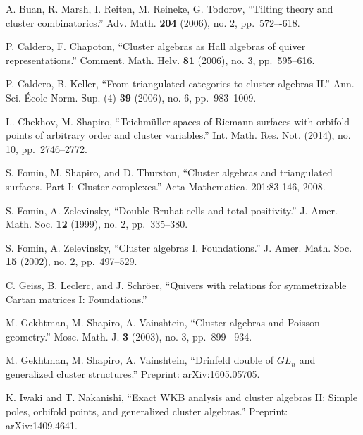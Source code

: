 \documentclass{amsart}
\numberwithin{equation}{section}
\theoremstyle{definition}
\begin{document}
\begin{thebibliography}{99}
A. Buan, R. Marsh, I. Reiten, M. Reineke, G. Todorov, ``Tilting theory and cluster combinatorics.'' Adv. Math. \textbf{204} (2006), no. 2, pp.~572–-618.

P. Caldero, F. Chapoton, ``Cluster algebras as Hall algebras of quiver representations.'' Comment. Math. Helv. \textbf{81} (2006), no. 3, pp.~595--616.

P. Caldero, B. Keller, ``From triangulated categories to cluster algebras II.''  Ann. Sci. \'Ecole Norm. Sup. (4) \textbf{39} (2006), no. 6, pp.~983--1009.

L. Chekhov, M. Shapiro, ``Teichm\"uller spaces of Riemann surfaces with orbifold points of arbitrary order and cluster variables.'' Int. Math. Res. Not. (2014), no. 10, pp.~2746--2772.

S. Fomin, M. Shapiro, and D. Thurston, ``Cluster algebras and triangulated surfaces. Part I: Cluster complexes.'' Acta Mathematica, 201:83-146, 2008.

S. Fomin, A. Zelevinsky, ``Double Bruhat cells and total positivity.''  J. Amer. Math. Soc. \textbf{12} (1999), no. 2, pp.~335--380.

S. Fomin, A. Zelevinsky, ``Cluster algebras I. Foundations.''  J. Amer. Math. Soc. \textbf{15} (2002), no. 2, pp.~497--529.

C. Geiss, B. Leclerc, and J. Schr\"oer, ``Quivers with relations for symmetrizable Cartan matrices I: Foundations.'' 

M. Gekhtman, M. Shapiro, A. Vainshtein, ``Cluster algebras and Poisson geometry.'' Mosc. Math. J. \textbf{3} (2003), no. 3, pp.~899-–934.

M. Gekhtman, M. Shapiro, A. Vainshtein, ``Drinfeld double of $GL_n$ and generalized cluster structures.''  Preprint: arXiv:1605.05705.

K. Iwaki and T. Nakanishi, ``Exact WKB analysis and cluster algebras II: Simple poles, orbifold points, and generalized cluster algebras.'' Preprint: arXiv:1409.4641.

\end{thebibliography}
\end{document}
